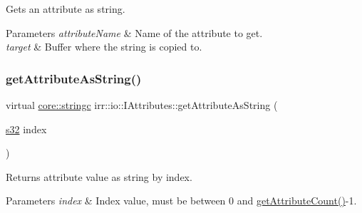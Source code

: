 Gets an attribute as string. 


\begin{DoxyParams}{Parameters}
{\em attribute\+Name} & Name of the attribute to get. \\
\hline
{\em target} & Buffer where the string is copied to. \\
\hline
\end{DoxyParams}
\mbox{\label{classirr_1_1io_1_1IAttributes_a9938e13ea4cc3e8e0ea3fadacaa97c5c}} 
\subsubsection{\texorpdfstring{get\+Attribute\+As\+String()}{getAttributeAsString()}\hspace{0.1cm}{\footnotesize\ttfamily [3/3]}}
{\footnotesize\ttfamily virtual \hyperlink{namespaceirr_1_1core_ade1071a878633f2f6d8a75c5d11fec19}{core\+::stringc} irr\+::io\+::\+I\+Attributes\+::get\+Attribute\+As\+String (\begin{DoxyParamCaption}\item[{\hyperlink{namespaceirr_ac66849b7a6ed16e30ebede579f9b47c6}{s32}}]{index }\end{DoxyParamCaption})\hspace{0.3cm}{\ttfamily [pure virtual]}}



Returns attribute value as string by index. 


\begin{DoxyParams}{Parameters}
{\em index} & Index value, must be between 0 and \hyperlink{classirr_1_1io_1_1IAttributes_a796bdd9440ee7ba0b6742a90a82870b6}{get\+Attribute\+Count()}-\/1. \\
\hline
\end{DoxyParams}
\mbox{\label{classirr_1_1io_1_1IAttributes_a874219751c3a52d781cdfa372cd8bcf5}} 
